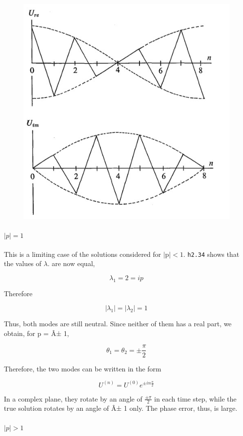\begin{figure}
    \centering
    \includegraphics[width = .7 \textwidth]{figs/NM/pic8.jpg}
    \caption{} \label{fig:}
\end{figure}

\paragraph{\texorpdfstring{\(\left| p \right| = 1\)}{\textbackslash left\textbar{} p \textbackslash right\textbar{} = 1}}\label{left-p-right-1}

This is a limiting case of the solutions considered for
\(\left| \text{p} \right| < 1\). \texttt{h2.34} shows that the values of
\(\lambda\). are now equal,

\[\lambda_{1} = 2 = ip\]

Therefore

\[\left| \lambda_{1} \right| = \left| \lambda_{2} \right| = 1\]

Thus, both modes are still neutral. Since neither of them has a real
part, we obtain, for p = Â± 1,

\[\theta_{1} = \theta_{2} = \pm \frac{\pi}{2}\]

Therefore, the two modes can be written in the form

\[U^{\left( n \right)} = U^{\left( 0 \right)}e^{\pm i n\frac{\pi}{2}}\]

In a complex plane, they rotate by an angle of \(\frac{\pm \pi}{2}\) in
each time step, while the true solution rotates by an angle of Â± 1
only. The phase error, thus, is large.

\paragraph{\texorpdfstring{\(\left| p \right| > 1\)}{\textbackslash left\textbar{} p \textbackslash right\textbar{} \textgreater{} 1}}\label{left-p-right-1-1}

